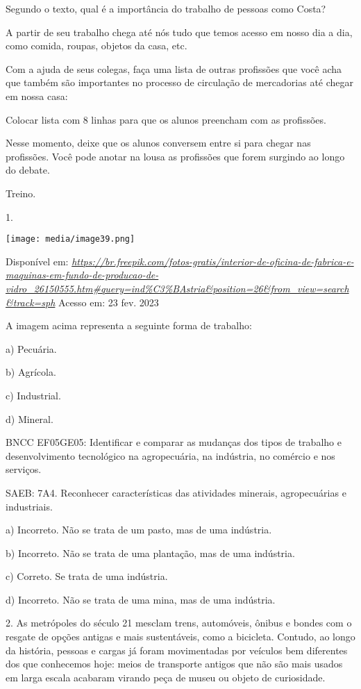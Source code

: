 Segundo o texto, qual é a importância do trabalho de pessoas como Costa?

A partir de seu trabalho chega até nós tudo que temos acesso em nosso
dia a dia, como comida, roupas, objetos da casa, etc.

Com a ajuda de seus colegas, faça uma lista de outras profissões que
você acha que também são importantes no processo de circulação de
mercadorias até chegar em nossa casa:

Colocar lista com 8 linhas para que os alunos preencham com as
profissões.

Nesse momento, deixe que os alunos conversem entre si para chegar nas
profissões. Você pode anotar na lousa as profissões que forem surgindo
ao longo do debate.

Treino.

1.

\texttt{[image: media/image39.png]}

Disponível em:
\href{https://br.freepik.com/fotos-gratis/interior-de-oficina-de-fabrica-e-maquinas-em-fundo-de-producao-de-vidro_26150555.htm\#query=ind\%C3\%BAstria\&position=26\&from_view=search\&track=sph}{\emph{https://br.freepik.com/fotos-gratis/interior-de-oficina-de-fabrica-e-maquinas-em-fundo-de-producao-de-vidro\_26150555.htm\#query=ind\%C3\%BAstria\&position=26\&from\_view=search\&track=sph}}
Acesso em: 23 fev. 2023

A imagem acima representa a seguinte forma de trabalho:

a) Pecuária.

b) Agrícola.

c) Industrial.

d) Mineral.

BNCC EF05GE05: Identificar e comparar as mudanças dos tipos de trabalho
e desenvolvimento tecnológico na agropecuária, na indústria, no comércio
e nos serviços.

SAEB: 7A4. Reconhecer características das atividades minerais,
agropecuárias e industriais.

a) Incorreto. Não se trata de um pasto, mas de uma indústria.

b) Incorreto. Não se trata de uma plantação, mas de uma indústria.

c) Correto. Se trata de uma indústria.

d) Incorreto. Não se trata de uma mina, mas de uma indústria.

2. As metrópoles do século 21 mesclam trens, automóveis, ônibus e bondes
com o resgate de opções antigas e mais sustentáveis, como a bicicleta.
Contudo, ao longo da história, pessoas e cargas já foram movimentadas
por veículos bem diferentes dos que conhecemos hoje: meios de transporte
antigos que não são mais usados em larga escala acabaram virando peça de
museu ou objeto de curiosidade.

